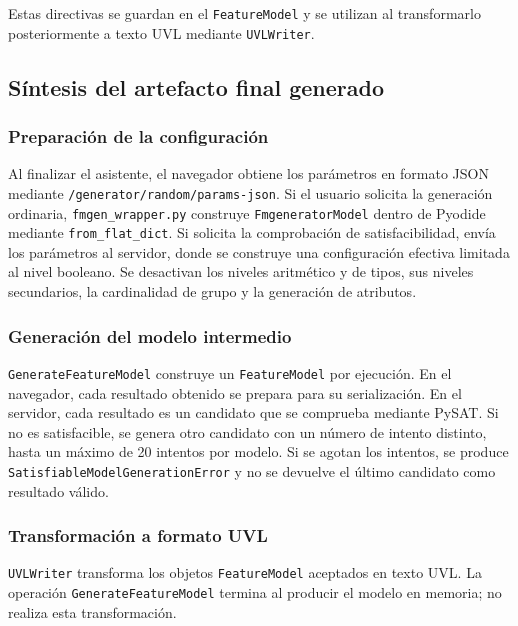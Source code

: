 Estas directivas se guardan en el \texttt{FeatureModel} y se utilizan al
transformarlo posteriormente a texto UVL mediante \texttt{UVLWriter}.

\subsection{Síntesis del artefacto final generado}
\label{subsec:sintesis}

\subsubsection*{Preparación de la configuración}

Al finalizar el asistente, el navegador obtiene los parámetros en formato
JSON mediante \texttt{/generator/random/params-json}. Si el usuario solicita
la generación ordinaria, \texttt{fmgen\_wrapper.py} construye
\texttt{FmgeneratorModel} dentro de Pyodide mediante
\texttt{from\_flat\_dict}. Si solicita la comprobación de
satisfacibilidad, envía los parámetros al servidor, donde se construye una
configuración efectiva limitada al nivel booleano. Se desactivan los niveles
aritmético y de tipos, sus niveles secundarios, la cardinalidad de grupo y
la generación de atributos.

\subsubsection*{Generación del modelo intermedio}

\texttt{GenerateFeatureModel} construye un \texttt{FeatureModel} por
ejecución. En el navegador, cada resultado obtenido se prepara para su
serialización. En el servidor, cada resultado es un candidato que se
comprueba mediante PySAT. Si no es satisfacible, se genera otro candidato
con un número de intento distinto, hasta un máximo de 20 intentos por
modelo. Si se agotan los intentos, se produce
\texttt{SatisfiableModelGenerationError} y no se devuelve el último
candidato como resultado válido.

\subsubsection*{Transformación a formato UVL}

\texttt{UVLWriter} transforma los objetos \texttt{FeatureModel} aceptados
en texto UVL. La operación \texttt{GenerateFeatureModel} termina al producir
el modelo en memoria; no realiza esta transformación.

